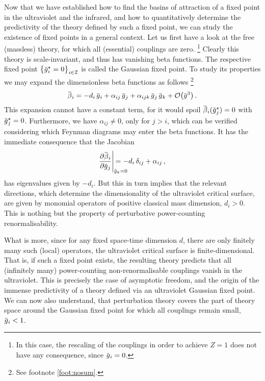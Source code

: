 \documentclass[11pt]{book}
\newcommand{\overbar}[1]{\mkern 1.5mu\overline{\mkern-1.5mu#1\mkern-1.5mu}\mkern 1.5mu}
\numberwithin{equation}{chapter}
\begin{document}
Now that we have established how to find the basins
of attraction of a fixed point in the ultraviolet and the infrared,
and how to quantitatively determine the predictivity
of the theory defined by such a fixed point,
we can study the existence of fixed points
in a general context.
Let us first have a look at the
free (massless) theory, for which
all (essential) couplings are zero.%
\footnote{
  In this case, the rescaling of the couplings
  in order to achieve $Z=1$ does not have any consequence,
  since $\overbar g_i = 0$.
}
Clearly this
theory is scale-invariant, and thus has vanishing
beta functions. The respective fixed point
$\big\lbrace \overbar g_i^\star = 0 \big\rbrace_{i \in \mathcal I}$
is called the Gaussian fixed point.
To study its properties we may expand the dimensionless
beta functions as follows%
\footnote{
  See footnote \ref{foot:nosum}.
}
\begin{align}
  \overbar \beta_i =
  - d_i \, \overbar g_i
  + \alpha_{ij} \, \overbar g_j
  + \alpha_{ijk} \, \overbar g_j \, \overbar g_k
  + \mathcal O \big( \overbar g^3 \big) \,.
\end{align}
This expansion cannot have a constant term, for
it would spoil
$\overbar \beta_i(\overbar g_j^\star) = 0$
with $\overbar g_j^\star = 0$.
Furthermore, we have $\alpha_{ij} \neq 0$,
only for $j>i$,
which can be verified
considering which Feynman diagrams may enter the
beta functions.
It has the immediate consequence that the Jacobian
\begin{align}
  \frac{ \partial \overbar \beta_i }{ \partial \overbar g_j}
  \Bigg|_{ \overbar g_k = 0 }
  \hspace{-7mm}
  = - d_i \, \delta_{ij} + \alpha_{ij} \,,
\end{align}
has eigenvalues given by $-d_i$.
But this in turn implies that the relevant directions,
which determine the dimensionality of the ultraviolet critical surface,
are given by monomial operators of positive classical mass dimension,
$d_i > 0$.
This is nothing but the property of perturbative power-counting renormalisability.

What is more, since for any fixed space-time dimension $d$,
there are only finitely many such (local) operators,
the ultraviolet critical surface is finite-dimensional.
That is, if such a fixed point exists, the resulting theory predicts
that all (infinitely many) power-counting non-renormalisable couplings
vanish in the ultraviolet. This is precisely the case of asymptotic
freedom, and the origin of the immense predictivity of a theory
defined via an ultraviolet Gaussian fixed point.
We can now also understand, that perturbation theory covers
the part of theory space around the Gaussian fixed point
for which all couplings remain small, $\overbar g_i < 1$.
\end{document}
